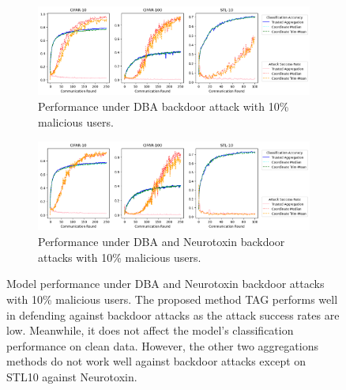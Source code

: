 \documentclass{article} %
\begin{document}
\begin{figure}[htp]
\centering
  \begin{subfigure}{\textwidth}
  \centering
    \includegraphics[height=3cm, width=.75\textwidth]{pics/accuracy--n_malicious1--dba0--beta0.2.png}
    \caption{\footnotesize Performance under DBA backdoor attack with 10\% malicious users.}
  \end{subfigure}%

  \begin{subfigure}{\textwidth}
  \centering
    \includegraphics[height=3cm, width=.75\textwidth]{pics/accuracy--n_malicious1--dba0--beta0.2--neuro_p0.1.png}
    \caption{\footnotesize Performance under DBA and Neurotoxin backdoor attacks with 10\% malicious users.}
  \end{subfigure}%
\caption{\footnotesize Model performance under DBA and Neurotoxin backdoor attacks with 10\% malicious users. The proposed method TAG performs well in defending against backdoor attacks as the attack success rates are low. Meanwhile, it does not affect the model's classification performance on clean data. However, the other two aggregations methods do not work well against backdoor attacks except on STL10 against Neurotoxin.} 
\label{fig: accuracy--n_malicious1}
\end{figure}
\end{document}
